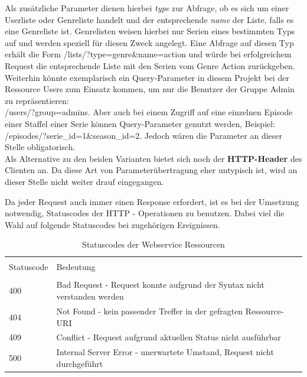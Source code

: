 \documentclass[a4paper]{article}
\begin{document}
Als zusätzliche Parameter dienen hierbei \textit{type} zur Abfrage, ob es sich um einer Userliste oder Genreliste handelt und der entsprechende \textit{name} der Liste, falls es eine Genreliste ist.
Genrelisten weisen hierbei nur Serien eines bestimmten Typs auf und werden speziell für diesen Zweck angelegt. Eine Abfrage auf diesen Typ erhält die Form \textsf{/lists/?type=genre\&name=action} und würde bei erfolgreichem Request die entsprechende Liste mit den Serien vom Genre Action zurückgeben.
\\
Weiterhin könnte exemplarisch  ein Query-Parameter in diesem Projekt bei der Ressource Users zum Einsatz kommen, um nur die Benutzer der Gruppe Admin zu repräsentieren:\\ \textsf{/users/?group=admins}. Aber auch bei einem Zugriff auf eine einzelnen Episode einer Staffel einer Serie können Query-Parameter genutzt werden, Beispiel: \textsf{/episodes/?serie\_id=1\&season\_id=2}. Jedoch wären die Parameter an dieser Stelle obligatorisch.
\\
Als Alternative zu den beiden Varianten bietet sich noch der \textbf{HTTP-Header} des Clienten an. Da diese Art von Parameterübertragung eher untypisch ist, wird an dieser Stelle nicht weiter drauf eingegangen.

\parskip 12pt
\parindent 0pt
Da jeder Request auch immer einen Response erfordert, ist es bei der Umsetzung notwendig, Statuscodes der HTTP - Operationen zu benutzen. Dabei viel die Wahl auf folgende Statuscodes bei zugehörigen Ereignissen.

\begin{table}[H]
\caption{Statuscodes der Webservice Ressourcen}

\centering
\begin{tabular}{l l l}
\\ [-0.5ex]

\hline\hline
\\ [-0.5ex]
Statuscode & Bedeutung 
\\ [1.5ex]
\hline
\\ [-0.5ex]
400 & Bad Request - Request konnte aufgrund der Syntax nicht verstanden werden\\[1ex]
404 & Not Found - kein passender Treffer in der gefragten Ressource-URI \\[1ex]
409 & Conflict - Request aufgrund aktuellen Status nicht ausführbar\\[1ex]
500 & Internal Server Error - unerwartete Umstand, Request nicht durchgeführt\\[1ex]

\hline
\end{tabular}
\label{tab:statuscodes}
\end{table}
\end{document}
